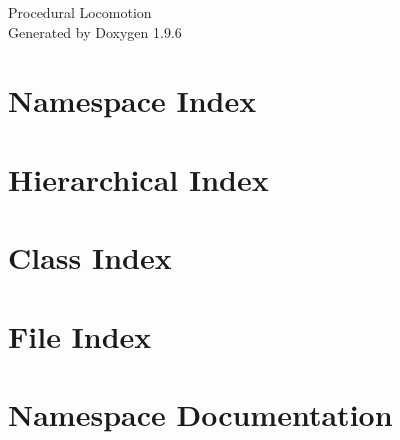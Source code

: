 \documentclass[twoside]{book}
\newcommand{\+}{\discretionary{\mbox{\scriptsize$\hookleftarrow$}}{}{}}
\newcommand{\clearemptydoublepage}{%
    \newpage{\pagestyle{empty}\cleardoublepage}%
  }
\begin{document}
  \raggedbottom
    \hypersetup{pageanchor=false,
                bookmarksnumbered=true,
                pdfencoding=unicode
               }
  \begin{titlepage}
  \vspace*{7cm}
  \begin{center}%
  {\Large Procedural Locomotion}\\
  \vspace*{1cm}
  {\large Generated by Doxygen 1.9.6}\\
  \end{center}
  \end{titlepage}
  \clearemptydoublepage
  \tableofcontents
  \clearemptydoublepage
  \hypersetup{pageanchor=true}
\chapter{Namespace Index}

\chapter{Hierarchical Index}

\chapter{Class Index}

\chapter{File Index}

\chapter{Namespace Documentation}











\end{document}
